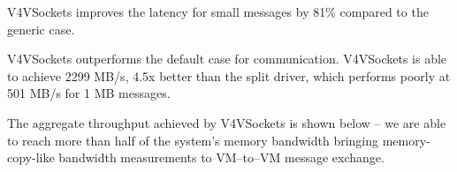 \documentclass[a0paper,portrait,final]{baposter}
\begin{document}
\begin{poster}
{\begin{multicols}{2}
\hspace{0.5em}


V4VSockets improves the latency for small messages by 81\% compared to the
generic case. 


V4VSockets outperforms the default case for communication. V4VSockets is able
to achieve 2299 MB/s, 4.5x better than the split driver, which performs poorly
at 501 MB/s for 1 MB messages.

The aggregate throughput achieved by V4VSockets is shown below -- we are able to reach more than half of the system's memory bandwidth%
bringing memory-copy-like bandwidth measurements to VM--to--VM message exchange.
\hspace{0.5em}


\end{multicols}

}

\end{poster}
\end{document}
